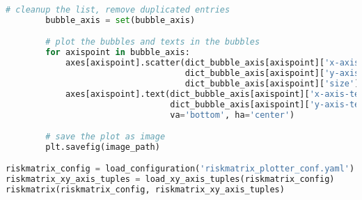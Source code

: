 \begin{lstlisting}[language=python, caption=Python LaTex - riskmatrix.py - Risxikomatrizen,captionpos=b,label={lst:riskmatrix},breaklines=true]
        # cleanup the list, remove duplicated entries
        bubble_axis = set(bubble_axis)

        # plot the bubbles and texts in the bubbles
        for axispoint in bubble_axis:
            axes[axispoint].scatter(dict_bubble_axis[axispoint]['x-axis-bubble'],
                                    dict_bubble_axis[axispoint]['y-axis-bubble'],
                                    dict_bubble_axis[axispoint]['size'], alpha=1)
            axes[axispoint].text(dict_bubble_axis[axispoint]['x-axis-text'],
                                 dict_bubble_axis[axispoint]['y-axis-text'], s=dict_bubble_axis[axispoint]['risk'],
                                 va='bottom', ha='center')

        # save the plot as image
        plt.savefig(image_path)

riskmatrix_config = load_configuration('riskmatrix_plotter_conf.yaml')
riskmatrix_xy_axis_tuples = load_xy_axis_tuples(riskmatrix_config)
riskmatrix(riskmatrix_config, riskmatrix_xy_axis_tuples)
\end{lstlisting}